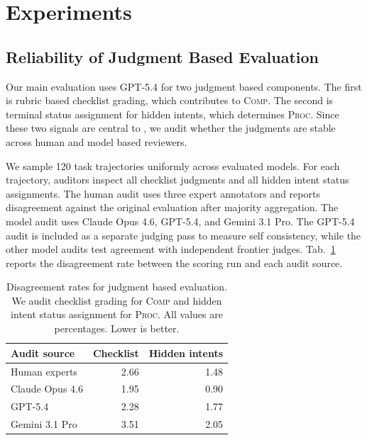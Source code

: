 
\section{Experiments}
\label{app:experiments}

\subsection{Reliability of Judgment Based Evaluation}
\label{app:judge_reliability}

Our main evaluation uses GPT-5.4 for two judgment based components. The first is rubric based checklist grading, which contributes to \textsc{Comp}. The second is terminal status assignment for hidden intents, which determines \textsc{Proc}. Since these two signals are central to {\bench}, we audit whether the judgments are stable across human and model based reviewers.

We sample 120 task trajectories uniformly across evaluated models. For each trajectory, auditors inspect all checklist judgments and all hidden intent status assignments. The human audit uses three expert annotators and reports disagreement against the original evaluation after majority aggregation. The model audit uses Claude Opus 4.6, GPT-5.4, and Gemini 3.1 Pro. The GPT-5.4 audit is included as a separate judging pass to measure self consistency, while the other model audits test agreement with independent frontier judges. Tab.~\ref{tab:judge_reliability} reports the disagreement rate between the scoring run and each audit source.

\begin{table}[h]
\centering
\caption{Disagreement rates for judgment based evaluation. We audit checklist grading for \textsc{Comp} and hidden intent status assignment for \textsc{Proc}. All values are percentages. Lower is better.}
\label{tab:judge_reliability}
\begin{tabular}{lrr}
\toprule[1.25pt]
\textbf{Audit source} &
\textbf{Checklist} &
\textbf{Hidden intents} \\
\midrule[0.75pt]
Human experts & 2.66 & 1.48 \\
Claude Opus 4.6 & 1.95 & 0.90 \\
GPT-5.4 & 2.28 & 1.77 \\
Gemini 3.1 Pro & 3.51 & 2.05 \\
\bottomrule[1.25pt]
\end{tabular}
\vspace{-4pt}
\end{table}

